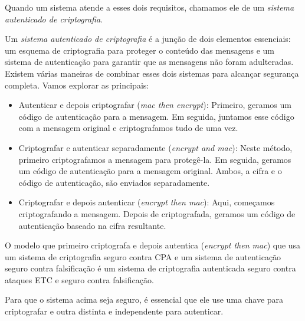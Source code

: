 Quando um sistema atende a esses dois requisitos, chamamos ele de um {\em sistema autenticado de criptografia}.

Um {\em sistema autenticado de criptografia} é a junção de dois elementos essenciais:
um esquema de criptografia para proteger o conteúdo das mensagens e um sistema de autenticação para garantir que as mensagens não foram adulteradas.
Existem várias maneiras de combinar esses dois sistemas para alcançar segurança completa. Vamos explorar as principais:

\begin{itemize}
\item Autenticar e depois criptografar ({\em mac then encrypt}):
  Primeiro, geramos um código de autenticação para a mensagem.
  Em seguida, juntamos esse código com a mensagem original e criptografamos tudo de uma vez. 
\item Criptografar e autenticar separadamente ({\em encrypt and mac}):
  Neste método, primeiro criptografamos a mensagem para protegê-la.
  Em seguida, geramos um código de autenticação para a mensagem original.
  Ambos, a cifra e o código de autenticação, são enviados separadamente.
\item Criptografar e depois autenticar ({\em encrypt then mac}):
  Aqui, começamos criptografando a mensagem.
  Depois de criptografada, geramos um código de autenticação baseado na cifra resultante. 
\end{itemize}

\begin{theorem}
  O modelo que primeiro criptografa e depois autentica ({\em encrypt then mac}) que usa um sistema de criptografia seguro contra CPA e um sistema de autenticação seguro contra falsificação é um sistema de criptografia autenticada seguro contra ataques ETC e seguro contra falsificação. 
\end{theorem}

Para que o sistema acima seja seguro, é essencial que ele use uma chave para criptografar e outra distinta e independente para autenticar.

